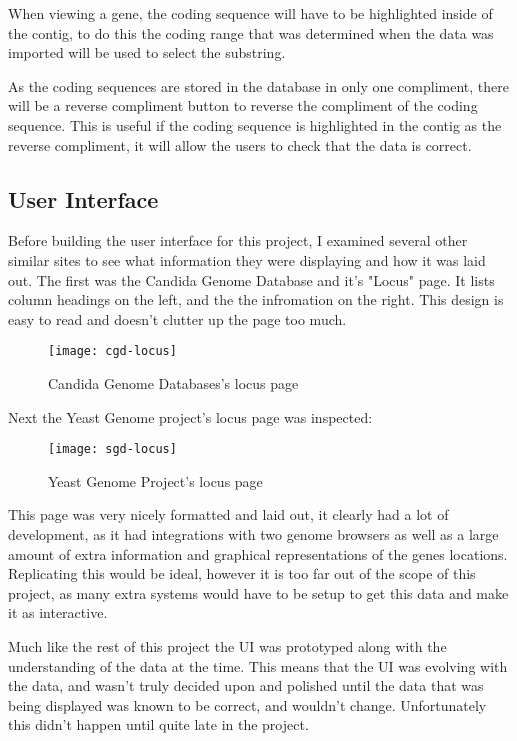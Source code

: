 When viewing a gene, the coding sequence will have to be highlighted inside of the contig, to do this the coding range that was determined when the data was imported will be used to select the substring. 

As the coding sequences are stored in the database in only one compliment, there will be a reverse compliment button to reverse the compliment of the coding sequence. This is useful if the coding sequence is highlighted in the contig as the reverse compliment, it will allow the users to check that the data is correct. 

\subsection{User Interface}
Before building the user interface for this project, I examined several other similar sites to see what information they were displaying and how it was laid out. The first was the Candida Genome Database\cite{cgd} and it's "Locus" page. It lists column headings on the left, and the the infromation on the right. This design is easy to read and doesn't clutter up the page too much.

\begin{figure}[H]
\begin{center}
\texttt{[image: cgd-locus]}
\caption{Candida Genome Databases's locus page}
\end{center}
\end{figure}

Next the Yeast Genome\cite{sgd} project's locus page was inspected:

\begin{figure}[H]
\begin{center}
\texttt{[image: sgd-locus]}
\caption{Yeast Genome Project's locus page}
\end{center}
\end{figure}

This page was very nicely formatted and laid out, it clearly had a lot of development, as it had integrations with two genome browsers as well as a large amount of extra information and graphical representations of the genes locations. Replicating this would be ideal, however it is too far out of the scope of this project, as many extra systems would have to be setup to get this data and make it as interactive.

Much like the rest of this project the UI was prototyped along with the understanding of the data at the time. This means that the UI was evolving with the data, and wasn't truly decided upon and polished until the data that was being displayed was known to be correct, and wouldn't change. Unfortunately this didn't happen until quite late in the project. 

